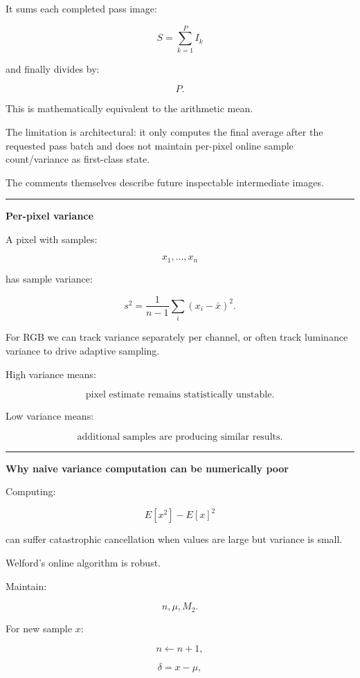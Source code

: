 It sums each completed pass image:

\[
S=
\sum_{k=1}^{P}I_k
\]

and finally divides by:

\[
P.
\]

This is mathematically equivalent to the arithmetic mean.

The limitation is architectural: it only computes the final average after the requested pass batch and does not maintain per-pixel online sample count/variance as first-class state.

The comments themselves describe future inspectable intermediate images.

\begin{center}\rule{0.5\linewidth}{0.5pt}\end{center}

\textbf{Per-pixel variance}

A pixel with samples:

\[
x_1,\dots,x_n
\]

has sample variance:

\[
\boxed{
s^2
=
\frac{
1
}{
n-1
}
\sum_i
(x_i-\bar x)^2.
}
\]

For RGB we can track variance separately per channel, or often track luminance variance to drive adaptive sampling.

High variance means:

\[
\text{pixel estimate remains statistically unstable}.
\]

Low variance means:

\[
\text{additional samples are producing similar results}.
\]

\begin{center}\rule{0.5\linewidth}{0.5pt}\end{center}

\textbf{Why naive variance computation can be numerically poor}

Computing:

\[
E[x^2]-E[x]^2
\]

can suffer catastrophic cancellation when values are large but variance is small.

Welford's online algorithm is robust.

Maintain:

\[
n,\mu,M_2.
\]

For new sample \(x\):

\[
n\leftarrow n+1,
\]

\[
\delta=x-\mu,
\]

